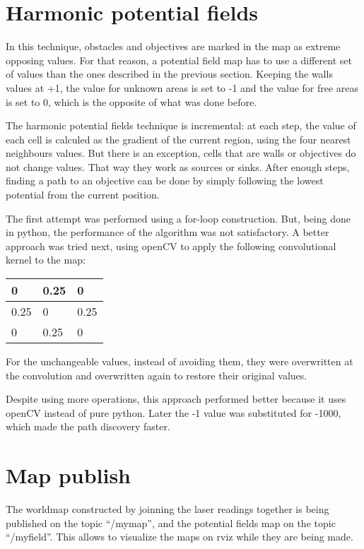 \documentclass[a4paper,twocolumn]{article}
\begin{document}
\section{Harmonic potential fields}
    In this technique, obstacles and objectives are marked in the map as extreme opposing values. For that reason, a potential field map has to use a different set of values than the ones described in the previous section. Keeping the walls values at +1, the value for unknown areas is set to -1 and the value for free areas is set to 0, which is the opposite of what was done before.

    The harmonic potential fields technique is incremental: at each step, the value of each cell is calculed as the gradient of the current region, using the four nearest neighbours values. But there is an exception, cells that are walls or objectives do not change values. That way they work as sources or sinks. After enough steps, finding a path to an objective can be done by simply following the lowest potential from the current position.

    The first attempt was performed using a for-loop construction. But, being done in python, the performance of the algorithm was not satisfactory. A better approach was tried next, using openCV to apply the following convolutional kernel to the map:

    \begin{tabular}{|l|l|l|}
        \hline
        0 & 0.25 & 0 \\
        \hline
        0.25 & 0 & 0.25 \\
        \hline
        0 & 0.25 & 0 \\
        \hline
    \end{tabular}

    For the unchangeable values, instead of avoiding them, they were overwritten at the convolution and overwritten again to restore their original values.

    Despite using more operations, this approach performed better because it uses openCV instead of pure python. Later the -1 value was substituted for -1000, which made the path discovery faster.

\section{Map publish}
    The worldmap constructed by joinning the laser readings together is being published on the topic ``/mymap'', and the potential fields map on the topic ``/myfield''. This allows to visualize the maps on rviz while they are being made. 
    
\end{document}

